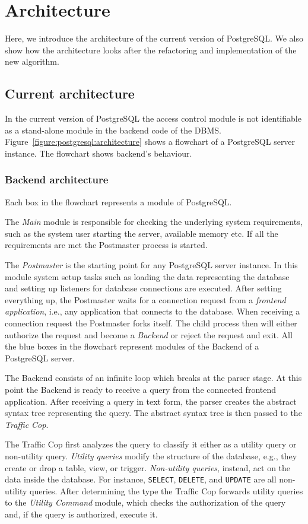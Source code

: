 \section{Architecture}


Here, we introduce the architecture of the current version of PostgreSQL.
%
We also show how the architecture looks after the refactoring and implementation of the new algorithm.
%
\subsection{Current architecture}
%
In the current version of PostgreSQL the access control module is not identifiable as a stand-alone module in the backend code of the DBMS.
%
Figure~\ref{figure:postgresql:architecture} shows a flowchart of a PostgreSQL server instance.
%
The flowchart shows backend's behaviour.
%
\subsubsection{Backend architecture}
%
Each box in the flowchart represents a module of PostgreSQL.

The \emph{Main} module is responsible for checking the underlying system requirements, such as the system user starting the server, available memory etc. If all the requirements are met the {Postmaster} process is started.

The \emph{Postmaster} is the starting point for any PostgreSQL server instance. 
%
In this module system setup tasks such as loading the data representing the database and setting up listeners for database connections are executed.
%
After setting everything up, the Postmaster waits for a connection request from a \emph{frontend application}, i.e., any application that connects to the database.
%
When receiving a connection request the Postmaster forks itself.
%
The child process then will either authorize the request and become a \emph{Backend} or reject the request and exit.
%
All the blue boxes in the flowchart represent modules of the Backend of a PostgreSQL server.

The Backend consists of an infinite loop which breaks at the parser stage.
%
At this point the Backend is ready to receive a query from the connected frontend application.
%
After receiving a query in text form, the parser creates the abstract syntax tree representing the query.
%
The abstract syntax tree is then passed to the \emph{Traffic Cop}.

The Traffic Cop first analyzes the query to classify it either as a {utility query} or {non-utility query}.
%
\emph{Utility queries} modify the structure of the database, e.g., they create or drop a table, view, or  trigger.
%
\emph{Non-utility queries}, instead, act on the data inside the database.
%
For instance, \texttt{SELECT}, \texttt{DELETE}, and \texttt{UPDATE} are all non-utility queries. 
%
After determining the type the Traffic Cop forwards utility queries to the \emph{Utility Command} module, which checks the authorization of the query and, if the query is authorized, execute it.


